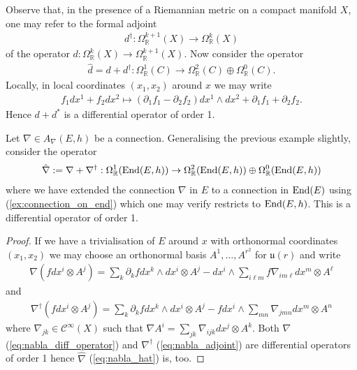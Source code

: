 \documentclass[12pt]{ociamthesis}  %
\begin{document}
\begin{example}
  Observe that, in the presence of a Riemannian metric on a compact
  manifold $X$, one may refer to the formal adjoint
  \begin{align*}
    d^\dagger : \Omega^{k+1}_{\mathbb{R}}(X)\to \Omega^{k}_{\mathbb{R}}(X)
  \end{align*}
  of the operator $d : \Omega^k_{\mathbb{R}}(X)\to\Omega^{k+1}_{\mathbb{R}}(X)$.
  Now consider the operator
  \begin{align}\label{eq:d_hat}
    \hat d = d + d^\dagger : \Omega^1_{\mathbb R}(C) \to \Omega^2_{\mathbb R}(C) \oplus \Omega^0_{\mathbb R}(C).
  \end{align}
  Locally, in local coordinates $(x_1,x_2)$ around $x$ we may write
  \begin{align*}
    f_1 dx^1 + f_2 dx^2 \mapsto
    (\partial_1 f_1 - \partial_2 f_2)dx^1\wedge dx^2
    + \partial_1 f_1 + \partial_2 f_2 .
  \end{align*}
  Hence $d + d^*$ is a differential operator of order 1.
\end{example}

\begin{example}
  Let $\nabla\in A_\nabla(E,h)$ be a connection. Generalising the previous
  example slightly, consider the operator 
  \begin{align}\label{eq:nabla_hat}
    \hat\nabla := \nabla + \nabla^\dagger :
    \Omega^1_{\mathbb R}(\operatorname{End}(E,h)) \to
    \Omega^2_{\mathbb R}(\operatorname{End}(E,h)) \oplus
    \Omega^0_{\mathbb R}(\operatorname{End}(E,h))
  \end{align}
  where we have extended the connection $\nabla$ in $E$ to a connection
  in $\operatorname{End}(E)$ using (\ref{ex:connection_on_end}) which
  one may verify restricts to $\operatorname{End}(E,h)$. This is a
  differential operator of order 1.
  \begin{proof}
    If we have a trivialisation of $E$ around $x$ with orthonormal coordinates
    $(x_1,x_2)$ we may choose an orthonormal basis $A^1,\ldots,A^{r^2}$ for
    $\mathfrak u(r)$ and write
    \begin{align}\label{eq:nabla_diff_operator}
      \nabla\left(fdx^i\otimes A^j\right)
      = \sum_k \partial_k f dx^k\wedge dx^i \otimes A^j
      - dx^i\wedge\sum_{i\ell m} f\nabla_{im\ell}dx^m\otimes A^\ell
    \end{align}
    and
    \begin{align}\label{eq:nabla_adjoint}
      \nabla^\dagger\left(fdx^i \otimes A^j\right)
      = \sum_k \partial_k fdx^k\wedge dx^i\otimes A^j
      - fdx^i \wedge \sum_{mn} \nabla_{jmn}dx^m\otimes A^n
    \end{align}
    where $\nabla_{jk}\in \mathscr C^\infty(X)$ such that
    $\nabla A^i = \sum_{jk}\nabla_{ijk}dx^j\otimes A^k$. Both
    $\nabla$ (\ref{eq:nabla_diff_operator}) and $\nabla^\dagger$
    (\ref{eq:nabla_adjoint}) are differential operators of order 1 hence
    $\hat\nabla$ (\ref{eq:nabla_hat}) is, too.
  \end{proof}
\end{example}
\end{document}
